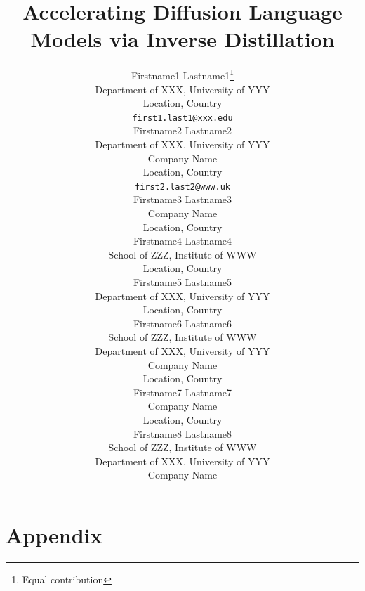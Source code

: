 \documentclass{article} %
\title{Accelerating Diffusion Language Models via Inverse Distillation}
\author{Firstname1 Lastname1\thanks{Equal contribution} \\
Department of XXX, University of YYY\\
Location, Country\\
\texttt{first1.last1@xxx.edu} \\
\And
Firstname2 Lastname2\footnotemark[1] \\
Department of XXX, University of YYY\\
Company Name\\
Location, Country\\
\texttt{first2.last2@www.uk} \\
\And
Firstname3 Lastname3 \\
Company Name\\
Location, Country\\
\And
Firstname4 Lastname4 \\
School of ZZZ, Institute of WWW\\
Location, Country\\
\And
Firstname5 Lastname5 \\
Department of XXX, University of YYY\\
Location, Country\\
\And
Firstname6 Lastname6 \\
School of ZZZ, Institute of WWW\\
Department of XXX, University of YYY\\
Company Name\\
Location, Country\\
\And
Firstname7 Lastname7 \\
Company Name\\
Location, Country\\
\And
Firstname8 Lastname8 \\
School of ZZZ, Institute of WWW\\
Department of XXX, University of YYY\\
Company Name
}
\theoremstyle{plain}
\theoremstyle{definition}
\theoremstyle{remark}
\begin{document}
\maketitle



% 



% 

\clearpage

\nocite{langley00}




\newpage
\appendix
\section*{Appendix}









\end{document}
